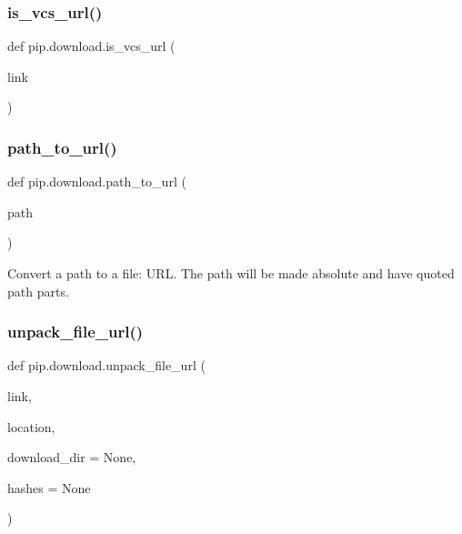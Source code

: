 \subsubsection{\texorpdfstring{is\+\_\+vcs\+\_\+url()}{is\_vcs\_url()}}
{\footnotesize\ttfamily def pip.\+download.\+is\+\_\+vcs\+\_\+url (\begin{DoxyParamCaption}\item[{}]{link }\end{DoxyParamCaption})}

\mbox{\label{namespacepip_1_1download_a7297c9435d47ee6174bded394c991c2a}} 
\subsubsection{\texorpdfstring{path\+\_\+to\+\_\+url()}{path\_to\_url()}}
{\footnotesize\ttfamily def pip.\+download.\+path\+\_\+to\+\_\+url (\begin{DoxyParamCaption}\item[{}]{path }\end{DoxyParamCaption})}

\begin{DoxyVerb}Convert a path to a file: URL.  The path will be made absolute and have
quoted path parts.
\end{DoxyVerb}
 \mbox{\label{namespacepip_1_1download_ae6e106ffe2dffa7730badf96e678d849}} 
\subsubsection{\texorpdfstring{unpack\+\_\+file\+\_\+url()}{unpack\_file\_url()}}
{\footnotesize\ttfamily def pip.\+download.\+unpack\+\_\+file\+\_\+url (\begin{DoxyParamCaption}\item[{}]{link,  }\item[{}]{location,  }\item[{}]{download\+\_\+dir = {\ttfamily None},  }\item[{}]{hashes = {\ttfamily None} }\end{DoxyParamCaption})}

